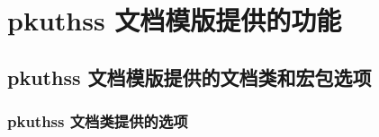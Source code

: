 %
%
%
%
%

\chapter{pkuthss 文档模版提供的功能}
\section{pkuthss 文档模版提供的文档类和宏包选项}
\subsection{pkuthss 文档类提供的选项}\label{ssec:options}

